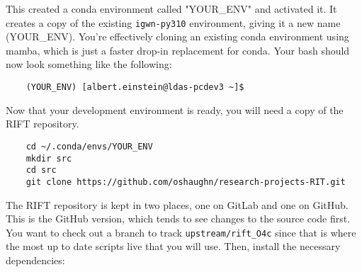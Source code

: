 \documentclass{article}
\begin{document}
\clearpage
This created a conda environment called "YOUR\_ENV" and activated it. It creates a copy of the existing \texttt{igwn-py310} environment, giving it a new name (YOUR\_ENV). You're effectively cloning an existing conda environment using mamba, which is just a faster drop-in replacement for conda. Your bash should now look something like the following:
\begin{verbatim}
    (YOUR_ENV) [albert.einstein@ldas-pcdev3 ~]$
\end{verbatim}
Now that your development environment is ready, you will need a copy of the RIFT repository. 

\begin{verbatim}
    cd ~/.conda/envs/YOUR_ENV 
    mkdir src
    cd src
    git clone https://github.com/oshaughn/research-projects-RIT.git
\end{verbatim}

The RIFT repository is kept in two places, one on GitLab and one on GitHub. This is the GitHub version, which tends to see changes to the source code first. You want to check out a branch to track \texttt{upstream/rift\_O4c} since that is where the most up to date scripts live that you will use. Then, install the necessary dependencies:
\end{document}

